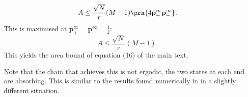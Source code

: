 \documentclass[9pt,twocolumn,twoside,lineno]{pnas-new}
\newcommand{\half}{\frac{1}{2}}
\newcommand{\prob}{\mathbf{p}}
\newcommand{\eq}{\prob^\infty}
\begin{document}
\begin{strip}
%
\begin{equation}\label{eq:multistateextarea}
  A \leq \frac{\sqrt{N}}{r}(M-1)\prn{4\eq_+\eq_-}.
\end{equation}
%
This is maximised at $\eq_+=\eq_-=\half$:
%
\begin{equation}\label{eq:maxarea}
  A \leq \frac{\sqrt{N}}{r}(M-1).
\end{equation}
%
This yields the area bound of equation (16) of the main text.

Note that the chain that achieves this is not ergodic, the two states at each end are absorbing. This is similar to the results found numerically in \cite{Barrett2008discrete} in a slightly different situation.


\end{strip}


%
%
\end{document}
